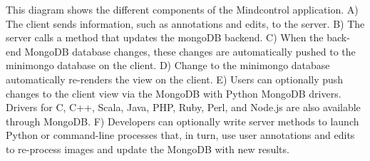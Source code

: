 \label{fig:appstructure}

This diagram shows the different components of the Mindcontrol application. A) The client sends information, such as annotations and edits, to the server. B) The server calls a method that updates the mongoDB backend. C) When the back-end MongoDB database changes, these changes are automatically pushed to the minimongo database on the client. D) Change to the minimongo database automatically re-renders the view on the client. E) Users can optionally push changes to the client view via the MongoDB with Python MongoDB drivers. Drivers for C, C++, Scala, Java, PHP, Ruby, Perl, and Node.js are also available through MongoDB. F) Developers can optionally write server methods to launch Python or command-line processes that, in turn, use user annotations and edits to re-process images and update the MongoDB with new results. 